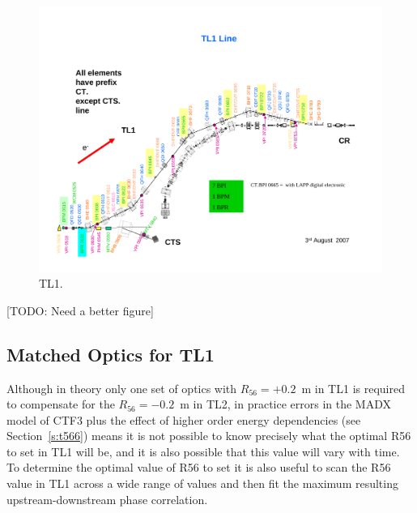 \begin{landscape}
	\begin{figure}
  		\centering
  		\includegraphics[height=\textwidth]{Figures/propagation/TL1}
  		\caption{TL1.}
  		\label{f:tl1Layout}
	\end{figure}
\end{landscape}
[TODO: Need a better figure]

\subsection{Matched Optics for TL1}
\label{ss:tl1Optics}

Although in theory only one set of optics with \(R_{56} = +0.2\)~m in TL1 is required to compensate for the \(R_{56} = -0.2\)~m in TL2, in practice errors in the MADX model of CTF3 plus the effect of higher order energy dependencies (see Section~\ref{s:t566}) means it is not possible to know precisely what the optimal R56 to set in TL1 will be, and it is also possible that this value will vary with time. To determine the optimal value of R56 to set it is also useful to scan the R56 value in TL1 across a wide range of values and then fit the maximum resulting upstream-downstream phase correlation.

